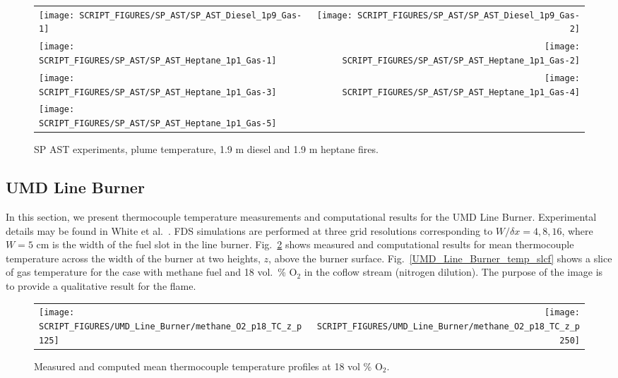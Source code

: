 \newpage

\begin{figure}[p]
\begin{tabular*}{\textwidth}{l@{\extracolsep{\fill}}r}
\texttt{[image: SCRIPT\_FIGURES/SP\_AST/SP\_AST\_Diesel\_1p9\_Gas-1]}   &  \texttt{[image: SCRIPT\_FIGURES/SP\_AST/SP\_AST\_Diesel\_1p9\_Gas-2]}    \\
\texttt{[image: SCRIPT\_FIGURES/SP\_AST/SP\_AST\_Heptane\_1p1\_Gas-1]}  &  \texttt{[image: SCRIPT\_FIGURES/SP\_AST/SP\_AST\_Heptane\_1p1\_Gas-2]}    \\
\texttt{[image: SCRIPT\_FIGURES/SP\_AST/SP\_AST\_Heptane\_1p1\_Gas-3]}  &  \texttt{[image: SCRIPT\_FIGURES/SP\_AST/SP\_AST\_Heptane\_1p1\_Gas-4]}     \\
\texttt{[image: SCRIPT\_FIGURES/SP\_AST/SP\_AST\_Heptane\_1p1\_Gas-5]}  &
\end{tabular*}
\caption[SP AST experiments, plume temperature, 1.9 m diesel and 1.1 m heptane fires]
{SP AST experiments, plume temperature, 1.9 m diesel and 1.9 m heptane fires.}
\label{SP_Diesel_1p9_Gas}
\end{figure}

\clearpage


\subsection{UMD Line Burner}
\label{UMD_Line_Burner_plumes}

In this section, we present thermocouple temperature measurements and computational results for the UMD Line Burner.  Experimental details may be found in White et al.~\cite{White:2015}. FDS simulations are performed at three grid resolutions corresponding to $W/\delta x = 4, 8, 16$, where $W = 5$ cm is the width of the fuel slot in the line burner. Fig.~\ref{UMD_Line_Burner_methane_O2_p18_TC} shows measured and computational results for mean thermocouple temperature across the width of the burner at two heights, $z$, above the burner surface. Fig.~\ref{UMD_Line_Burner_temp_slcf} shows a slice of gas temperature for the case with methane fuel and 18 vol.~\% O$_2$ in the coflow stream (nitrogen dilution).  The purpose of the image is to provide a qualitative result for the flame.

\begin{figure}[h]
\begin{tabular*}{\textwidth}{l@{\extracolsep{\fill}}r}
\texttt{[image: SCRIPT\_FIGURES/UMD\_Line\_Burner/methane\_O2\_p18\_TC\_z\_p125]} &
\texttt{[image: SCRIPT\_FIGURES/UMD\_Line\_Burner/methane\_O2\_p18\_TC\_z\_p250]}
\end{tabular*}
\caption[UMD\_Line\_Burner temperature profiles]
{Measured and computed mean thermocouple temperature profiles at 18 vol \% O$_2$.}
\label{UMD_Line_Burner_methane_O2_p18_TC}
\end{figure}

